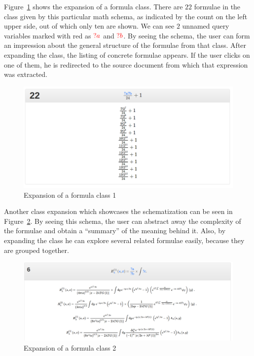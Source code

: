 Figure~\ref{fig:schema_instantiation} shows the expansion of a formula class.
There are $22$ formulae in the class given by this particular math schema, as
indicated by the count on the left upper side, out of which only ten are shown.
We can see $2$ unnamed query variables marked with red as $\textcolor{red}{?a}$ and
$\textcolor{red}{?b}$. By seeing the schema, the user can form an impression about the
general structure of the formulae from that class. After expanding the class,
the listing of concrete formulae appears. If the user clicks on one of them, he
is redirected to the source document from which that expression was extracted.

\begin{figure}[ht]\centering
    \includegraphics[width=12.8cm]{img/schemaInstGood.png}
    \caption{Expansion of a formula class 1}\label{fig:schema_instantiation}
\end{figure}
\FloatBarrier

Another class expansion which showcases the schematization can be seen in
Figure~\ref{fig:schema_instantiation3}. By seeing this schema, the user can
abstract away the complexity of the formulae and obtain a ``summary'' of the
meaning behind it. Also, by expanding the class he can explore several related
formulae easily, because they are grouped together.
\begin{figure}[ht]\centering
    \includegraphics[width=12.8cm]{img/schemaInstGood3.png}
    \caption{Expansion of a formula class 2}\label{fig:schema_instantiation3}
\end{figure}
\FloatBarrier

